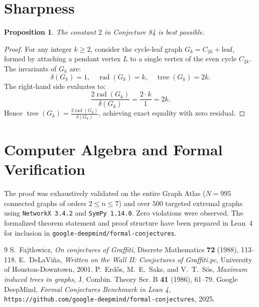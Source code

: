\documentclass[11pt,a4paper]{article}
\theoremstyle{plain}
\newtheorem{proposition}[theorem]{Proposition}
\theoremstyle{definition}
\begin{document}
\section{Sharpness}
\begin{proposition}
The constant $2$ in Conjecture 84 is best possible.
\end{proposition}
\begin{proof}
For any integer $k \ge 2$, consider the cycle-leaf graph $G_k = C_{2k} + \text{leaf}$, formed by attaching a pendant vertex $L$ to a single vertex of the even cycle $C_{2k}$. The invariants of $G_k$ are:
\[
\delta(G_k) = 1, \quad \operatorname{rad}(G_k) = k, \quad \operatorname{tree}(G_k) = 2k.
\]
The right-hand side evaluates to:
\[
\frac{2 \operatorname{rad}(G_k)}{\delta(G_k)} = \frac{2 \cdot k}{1} = 2k.
\]
Hence $\operatorname{tree}(G_k) = \frac{2 \operatorname{rad}(G_k)}{\delta(G_k)}$, achieving exact equality with zero residual.
\end{proof}

\section{Computer Algebra and Formal Verification}
The proof was exhaustively validated on the entire Graph Atlas ($N = 995$ connected graphs of orders $2 \le n \le 7$) and over $500$ targeted extremal graphs using \texttt{NetworkX 3.4.2} and \texttt{SymPy 1.14.0}. Zero violations were observed. The formalized theorem statement and proof structure have been prepared in Lean~4 for inclusion in \texttt{google-deepmind/formal-conjectures}.

\begin{thebibliography}{9}
 S.~Fajtlowicz, \textit{On conjectures of Graffiti}, Discrete Mathematics \textbf{72} (1988), 113--118.
 E.~DeLaVi\~na, \textit{Written on the Wall II: Conjectures of Graffiti.pc}, University of Houston-Downtown, 2001.
 P.~Erd\H{o}s, M.~E.~Saks, and V.~T.~S\'os, \textit{Maximum induced trees in graphs}, J. Combin. Theory Ser. B \textbf{41} (1986), 61--79.
 Google DeepMind, \textit{Formal Conjectures Benchmark in Lean 4}, \texttt{https://github.com/google-deepmind/formal-conjectures}, 2025.
\end{thebibliography}
\end{document}
